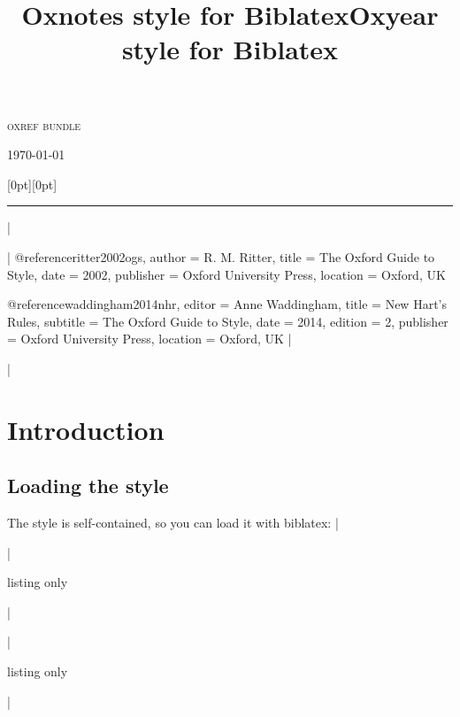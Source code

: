 \documentclass[extrafontsizes,11pt,a4paper,oneside]{memoir}
\title{Oxnotes style for Biblatex}|
\title{Oxyear style for Biblatex}|
\begin{document}
\thispagestyle{empty}
\begin{adjustwidth}{.2\textwidth}{0pt}
  \sffamily\setlength{\parindent}{0pt}%
  \LARGE\textsc{oxref bundle}
  
  \LARGE\thetitle
  
  \bigskip
  \Large\theauthor
  
  \bigskip
  \Large\ifx\undefined\thedate\today\else\thedate\fi
\end{adjustwidth}

\noindent
\hspace*{.1\textwidth}\raisebox{0pt}[0pt][0pt]{\rule{\normalrulethickness}{\textheight}}

\newpage
\tableofcontents*
|


\todoc[src]|
@reference{ritter2002ogs,
  author = {R. M. Ritter},
  title = {The {Oxford} Guide to Style},
  date = {2002},
  publisher = {Oxford University Press},
  location = {Oxford, UK}
}

@reference{waddingham2014nhr,
  editor = {Anne Waddingham},
  title = {New {Hart's} Rules},
  subtitle = {The {Oxford} Guide to Style},
  date = {2014},
  edition = {2},
  publisher = {Oxford University Press},
  location = {Oxford, UK}
}
|

\todoc|
\chapter{Introduction}

\section{Loading the style}\label{sec:loading}

The style is self-contained, so you can load it with \textsf{biblatex}:
|

\todoc[oxnotes]|
\begin{tcblisting}{listing only}
\usepackage[style=oxnotes]{biblatex}
\end{tcblisting}
|

\todoc[oxyear]|
\begin{tcblisting}{listing only}
\usepackage[style=oxyear]{biblatex}
\end{tcblisting}
|
\end{document}
